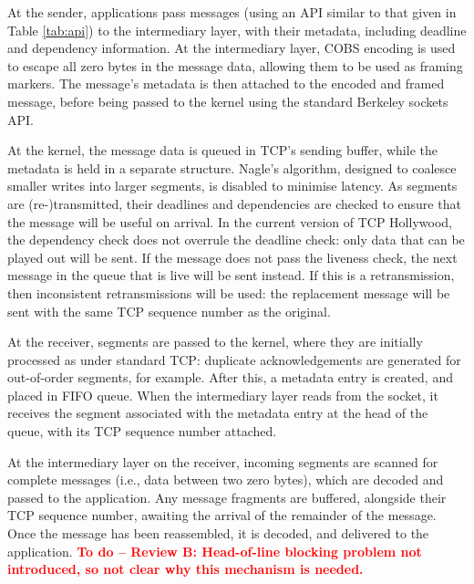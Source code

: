 \documentclass[10pt]{sig-alternate-05-2015}
\newcommand{\todo}[1]{\textbf{\textcolor{red}{To do -- #1}}}
\begin{document}
At the sender, applications pass messages (using an API similar to that
given in Table \ref{tab:api}) to the intermediary layer, with their
metadata, including deadline and dependency information. At the
intermediary layer, COBS encoding \cite{CB97COBS} is used to escape all
zero bytes in the message data, allowing them to be used as framing
markers. The message's metadata is then attached to the encoded and framed
message, before being passed to the kernel using the standard Berkeley
sockets API.

At the kernel, the message data is queued in TCP's sending buffer, while
the metadata is held in a separate structure. Nagle's algorithm, designed
to coalesce smaller writes into larger segments, is disabled to minimise
latency. As segments are (re-)transmitted, their deadlines and dependencies
are checked to ensure that the message will be useful on arrival. In the
current version of TCP Hollywood, the dependency check does not overrule
the deadline check: only data that can be played out will be sent. If the
message does not pass the liveness check, the next message in the queue
that is live will be sent instead. If this is a retransmission, then
inconsistent retransmissions will be used: the replacement message will be
sent with the same TCP sequence number as the original.

At the receiver, segments are passed to the kernel, where they are
initially processed as under standard TCP: duplicate acknowledgements are
generated for out-of-order segments, for example. After this, a metadata
entry is created, and placed in FIFO queue. When the intermediary layer
reads from the socket, it receives the segment associated with the
metadata entry at the head of the queue, with its TCP sequence number
attached.

At the intermediary layer on the receiver, incoming segments are scanned
for complete messages (i.e., data between two zero bytes), which are
decoded and passed to the application. Any message fragments are buffered,
alongside their TCP sequence number, awaiting the arrival of the remainder
of the message. Once the message has been reassembled, it is decoded, and
delivered to the application.
\todo{Review B: Head-of-line blocking problem not introduced, so not clear
why this mechanism is needed.}
\end{document}
